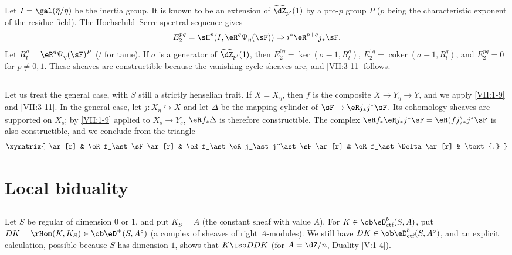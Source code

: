 Let $I=\gal(\bar\eta/\eta)$ be the inertia group. It is known to be an
extension of $\widehat\dZ_{p'}(1)$ by a pro-$p$ group $P$ ($p$ being the
characteristic exponent of the residue field). The Hochschild--Serre spectral
sequence gives
\[
  E_2^{p q} = \sH^p(I,\eR^q\Psi_\eta(\sF))\Rightarrow i^\ast \eR^{p+q}j_\ast\sF \text{.} 
\]
Let $R_t^q = \eR^q\Psi_\eta(\sF)^P$ ($t$ for tame). If $\sigma$ is a
generator of $\widehat\dZ_{p'}(1)$, then
$E_2^{0 q} = \ker(\sigma-1,R_t^q)$,
$E_2^{1 q} = \operatorname{coker}(\sigma-1,R_t^q)$, and $E_2^{p q} = 0$ for
$p\ne 0,1$. These sheaves are constructible because the vanishing-cycle
sheaves are, and \ref{VII:3-11} follows.






\subsection{}\label{VII:3-12}

Let us treat the general case, with $S$ still a strictly henselian trait. If
$X=X_\eta$, then $f$ is the composite $X\to Y_\eta \to Y$, and we apply
\ref{VII:1-9} and \ref{VII:3-11}. In the general case, let
$j:X_\eta\hookrightarrow X$ and let $\Delta$ be the mapping cylinder of
$\sF \to \eR j_\ast j^\ast \sF$. Its cohomology sheaves are supported on
$X_s$; by \ref{VII:1-9} applied to $X_s \to Y_s$,
$\eR f_\ast \Delta$ is therefore constructible. The complex
$\eR f_\ast \eR j_\ast j^\ast \sF = \eR(f j)_\ast j^\ast \sF$ is also
constructible, and we conclude from the triangle
\[\xymatrix{
  \ar[r] 
    & \eR f_\ast \sF \ar[r] 
    & \eR f_\ast \eR j_\ast j^\ast \sF \ar[r] 
    & \eR f_\ast \Delta \ar[r] 
    & \text{.} 
}\]










\section{Local biduality}\label{VII:4}






\subsection{}\label{VII:4-1}

Let $S$ be regular of dimension $0$ or $1$, and put $K_S=A$ (the constant
sheaf with value $A$). For $K\in\ob\eD_\text{ctf}^b(S,A)$, put
$D K=\rHom(K,K_S)\in\ob\eD^+(S,A^\circ)$ (a complex of sheaves of right
$A$-modules). We still have $D K\in\ob\eD_\text{ctf}^b(S,A^\circ)$, and an explicit
calculation, possible because $S$ has dimension $1$, shows that
$K\iso D D K$ (for $A=\dZ/n$, \hyperref[V]{Duality} \ref{V:1-4}).





